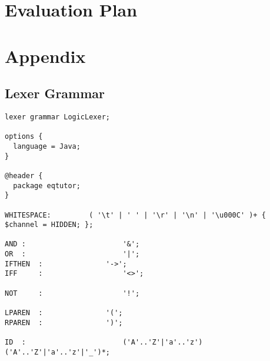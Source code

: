 \documentclass[11pt]{article}
\begin{document}
\newpage

\section{Evaluation Plan}

\newpage

\section{Appendix}
\subsection{Lexer Grammar}
\begin{verbatim}
lexer grammar LogicLexer;

options {
  language = Java;
}

@header {
  package eqtutor;
}

WHITESPACE:			( '\t' | ' ' | '\r' | '\n' | '\u000C' )+ { $channel = HIDDEN; };

AND	:						'&';
OR	:						'|';
IFTHEN	:				'->';
IFF 	:					'<>';

NOT 	:					'!';

LPAREN  :				'(';
RPAREN  :				')';

ID	:						('A'..'Z'|'a'..'z') ('A'..'Z'|'a'..'z'|'_')*;
\end{verbatim}

\newpage
\end{document}
